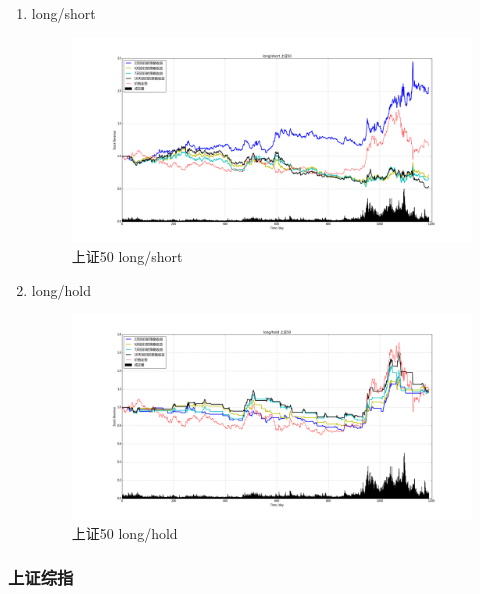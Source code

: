 \documentclass[12pt,a4paper]{article}
\begin{document}
\begin{enumerate}
\item long/short 
\begin{figure}[H]
	\centering
	\includegraphics[width=1.0\textwidth]{img_r_10/sz50.png}
	\caption{上证50 long/short}
\end{figure}

\item long/hold 
\begin{figure}[H]
	\centering
	\includegraphics[width=1.0\textwidth]{img_r_10/sz50_1.png}
	\caption{上证50 long/hold}
\end{figure}
\end{enumerate}

\subsubsection{上证综指}
\end{document}
